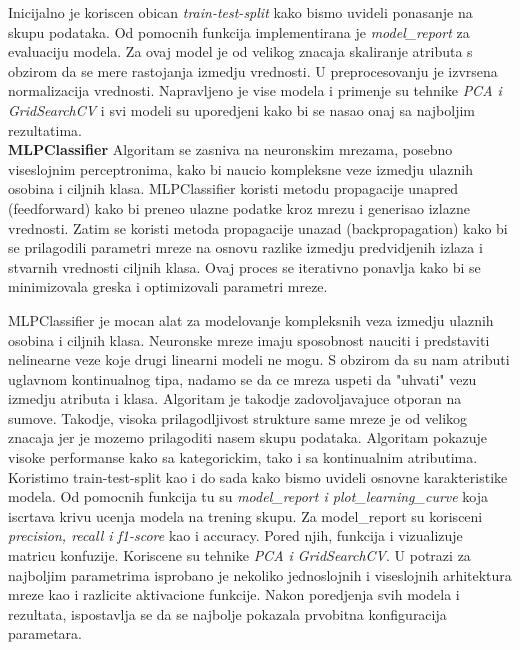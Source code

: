 \documentclass[10pt]{article}
\begin{document}
Inicijalno je koriscen obican \textit{train-test-split} kako bismo uvideli ponasanje na skupu podataka. Od pomocnih funkcija implementirana je \textit{model\_report} za evaluaciju modela. Za ovaj model je od velikog znacaja skaliranje atributa s obzirom da se mere rastojanja izmedju vrednosti. U preprocesovanju je izvrsena normalizacija vrednosti. Napravljeno je vise modela i primenje su tehnike \textit{PCA i GridSearchCV} i svi modeli su uporedjeni kako bi se nasao onaj sa najboljim rezultatima.\\

\textbf{MLPClassifier}
Algoritam se zasniva na neuronskim mrezama, posebno viseslojnim perceptronima, kako bi naucio kompleksne veze izmedju ulaznih osobina i ciljnih klasa. MLPClassifier koristi metodu propagacije unapred (feedforward) kako bi preneo ulazne podatke kroz mrezu i generisao izlazne vrednosti. Zatim se koristi metoda propagacije unazad (backpropagation) kako bi se prilagodili parametri mreze na osnovu razlike izmedju predvidjenih izlaza i stvarnih vrednosti ciljnih klasa. Ovaj proces se iterativno ponavlja kako bi se minimizovala greska i optimizovali parametri mreze. 

MLPClassifier je mocan alat za modelovanje kompleksnih veza izmedju ulaznih osobina i ciljnih klasa. Neuronske mreze imaju sposobnost nauciti i predstaviti nelinearne veze koje drugi linearni modeli ne mogu. S obzirom da su nam atributi uglavnom kontinualnog tipa, nadamo se da ce mreza uspeti da "uhvati" vezu izmedju atributa i klasa. Algoritam je takodje zadovoljavajuce otporan na sumove. Takodje, visoka prilagodljivost strukture same mreze je od velikog znacaja jer je mozemo prilagoditi nasem skupu podataka. Algoritam pokazuje visoke performanse kako sa kategorickim, tako i sa kontinualnim atributima.\\

Koristimo train-test-split kao i do sada kako bismo uvideli osnovne karakteristike modela. Od pomocnih funkcija tu su \textit{model\_report i plot\_learning\_curve} koja iscrtava krivu ucenja modela na trening skupu. Za model\_report su korisceni \textit{precision, recall i f1-score} kao i accuracy. Pored njih, funkcija i vizualizuje matricu konfuzije. Koriscene su tehnike \textit{PCA i GridSearchCV}. U potrazi za najboljim parametrima isprobano je nekoliko jednoslojnih i viseslojnih arhitektura mreze kao i razlicite aktivacione funkcije. Nakon poredjenja svih modela i rezultata, ispostavlja se da se najbolje pokazala prvobitna konfiguracija parametara.\\
\end{document}
